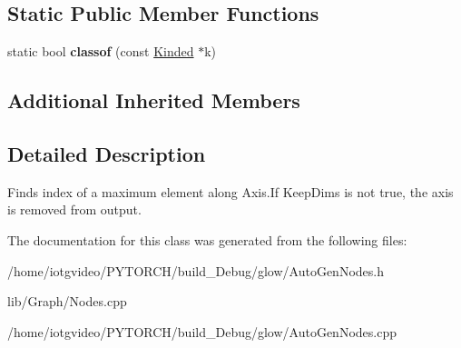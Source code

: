 \subsection*{Static Public Member Functions}
\begin{DoxyCompactItemize}
\item 
\mbox{\label{classglow_1_1_arg_max_node_a6b6b46c59f552a2b8f8f311e9179d5e5}} 
static bool {\bfseries classof} (const \hyperlink{classglow_1_1_kinded}{Kinded} $\ast$k)
\end{DoxyCompactItemize}
\subsection*{Additional Inherited Members}


\subsection{Detailed Description}
Finds index of a maximum element along Axis.\+If Keep\+Dims is not true, the axis is removed from output. 

The documentation for this class was generated from the following files\+:\begin{DoxyCompactItemize}
\item 
/home/iotgvideo/\+P\+Y\+T\+O\+R\+C\+H/build\+\_\+\+Debug/glow/Auto\+Gen\+Nodes.\+h\item 
lib/\+Graph/Nodes.\+cpp\item 
/home/iotgvideo/\+P\+Y\+T\+O\+R\+C\+H/build\+\_\+\+Debug/glow/Auto\+Gen\+Nodes.\+cpp\end{DoxyCompactItemize}
